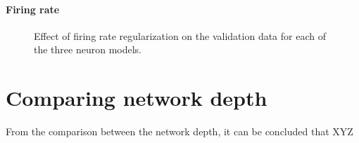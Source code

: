 	\paragraph{Firing rate}
		\begin{figure}[bth]
		    \myfloatalign
		     \quad
		    \caption[Effect of firing rate regularization for each of the three neuron models.]{Effect of firing rate regularization on the validation data for each of the three neuron models.}\label{fig:sl-reg}
		\end{figure}

\section{Comparing network depth}
From the comparison between the network depth, it can be concluded that XYZ

